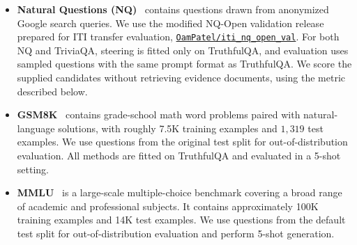 \begin{itemize}
    \item \textbf{Natural Questions (NQ)}~\citep{kwiatkowski2019natural} contains questions drawn from anonymized Google search queries. We use the modified NQ-Open validation release prepared for ITI transfer evaluation, \href{https://huggingface.co/datasets/OamPatel/iti_nq_open_val}{\texttt{OamPatel/iti\_nq\_open\_val}}. For both NQ and TriviaQA, steering is fitted only on TruthfulQA, and evaluation uses sampled questions with the same prompt format as TruthfulQA. We score the supplied candidates without retrieving evidence documents, using the metric described below.

    \item \textbf{GSM8K}~\citep{cobbe2021gsm8k} contains grade-school math word problems paired with natural-language solutions, with roughly 7.5K training examples and $1{,}319$ test examples. We use questions from the original test split for out-of-distribution evaluation. All methods are fitted on TruthfulQA and evaluated in a 5-shot setting.

    \item \textbf{MMLU}~\citep{hendrycks2020measuring} is a large-scale multiple-choice benchmark covering a broad range of academic and professional subjects. It contains approximately 100K training examples and 14K test examples. We use questions from the default test split for out-of-distribution evaluation and perform 5-shot generation.
\end{itemize}





